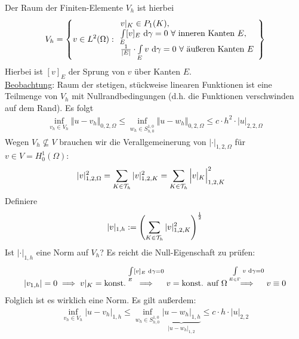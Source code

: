 Der Raum der Finiten-Elemente $V_h$ ist hierbei
\begin{align*}
	V_h=\left\lbrace v\in L^2(\Omega):
	\begin{array}{l}
		v|_K\in P_1(K), \\
		\int\limits_E [v]_E\text{ d}\gamma=0~\forall
		\text{ inneren Kanten $E$},\\
		\frac{1}{|E|}\cdot\int\limits_E v\text{ d}\gamma=0~\forall\text{ äußeren Kanten }E
	\end{array}
	\right\rbrace
\end{align*}
Hierbei ist $[v]_E$ der Sprung von $v$ über Kanten $E$.\\
\ul{Beobachtung}: Raum der stetigen, stückweise linearen Funktionen ist eine Teilmenge von $V_h$ mit Nullrandbedingungen (d.h. die Funktionen verschwinden auf dem Rand). Es folgt
\begin{align*}
	\inf\limits_{v_h\in V_h}\big\Vert u-v_h\big\Vert_{0,2,\Omega}
	\leq\inf\limits_{w_h\in S_{h,0}^{1,0}}\big\Vert u-w_h\big\Vert_{0,2,\Omega}
	\leq c\cdot h^2\cdot|u|_{2,2,\Omega}
\end{align*}
Wegen $V_h\not\subseteq V$ brauchen wir die Verallgemeinerung von $|\cdot|_{1,2,\Omega}$ für $v\in V=H^1_0(\Omega)$:
\begin{align*}
	|v|_{1,2,\Omega}^2
	&=\sum\limits_{K\in\mathcal{T}_h}|v|^2_{1,2,K}
	=\sum\limits_{K\in\mathcal{T}_h}\Big| v|_K\Big|^2_{1,2,K}
\end{align*}
Definiere
\begin{align*}
	|v|_{1,h}:=\left(\sum\limits_{K\in\mathcal{T}_h}|v|^2_{1,2,K}\right)^{\frac{1}{2}}
\end{align*}
Ist $|\cdot|_{1,h}$ eine Norm auf $V_h$? Es reicht die Null-Eigenschaft zu prüfen:
\begin{align*}
	|v_{1,h}|=0\implies v|_K=\text{konst.}
	\stackrel{\int\limits_E[v]_E\text{ d}\gamma=0}{\implies}
	v=\text{konst. auf }\Omega
	\stackrel{\int\limits_{E\in\Gamma} v\text{ d}\gamma=0}{\implies}
	v\equiv 0
\end{align*}
Folglich ist es wirklich eine Norm. Es gilt außerdem:
\begin{align*}
	\inf\limits_{v_h\in V_h}\big|u-v_h\big|_{1,h}
	\leq\inf\limits_{w_h\in S_{h,0}^{1,0}}\underbrace{\big|u-w_h\big|_{1,h}}_{|u-w_h|_{1,2}}
	\leq c\cdot h\cdot|u|_{2,2}
\end{align*}

